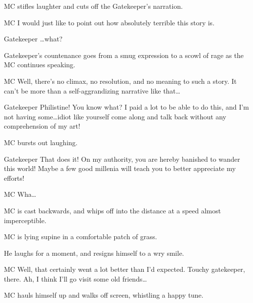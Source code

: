 


MC stifles laughter and cuts off the Gatekeeper's narration.

\begin{dialogue}{MC}
I would just like to point out how absolutely terrible this story is.
\end{dialogue}

\begin{dialogue}{Gatekeeper}
\ldots what?
\end{dialogue}

Gatekeeper's countenance goes from a smug expression to a scowl of rage as the MC continues speaking.

\begin{dialogue}{MC}
Well, there's no climax, no resolution, and no meaning to such a story.
It can't be more than a self-aggrandizing narrative like that\ldots
\end{dialogue}

\begin{dialogue}{Gatekeeper}
Philistine!
You know what?
I paid a lot to be able to do this, and I'm not having some\ldots idiot like yourself come along and talk back without any comprehension of my art!
\end{dialogue}

MC bursts out laughing.

\begin{dialogue}[continued]{Gatekeeper}
That does it!
On my authority, you are hereby banished to wander this world!
Maybe a few good millenia will teach you to better appreciate my efforts!
\end{dialogue}

\begin{dialogue}{MC}
Wha\ldots
\end{dialogue}

MC is cast backwards, and whips off into the distance at a speed almost imperceptible.


MC is lying supine in a comfortable patch of grass.

He laughs for a moment, and resigns himself to a wry smile.

\begin{dialogue}{MC}
Well, that certainly went a lot better than I'd expected.
Touchy gatekeeper, there.
Ah, I think I'll go visit some old friends\ldots
\end{dialogue}

MC hauls himself up and walks off screen, whistling a happy tune.

